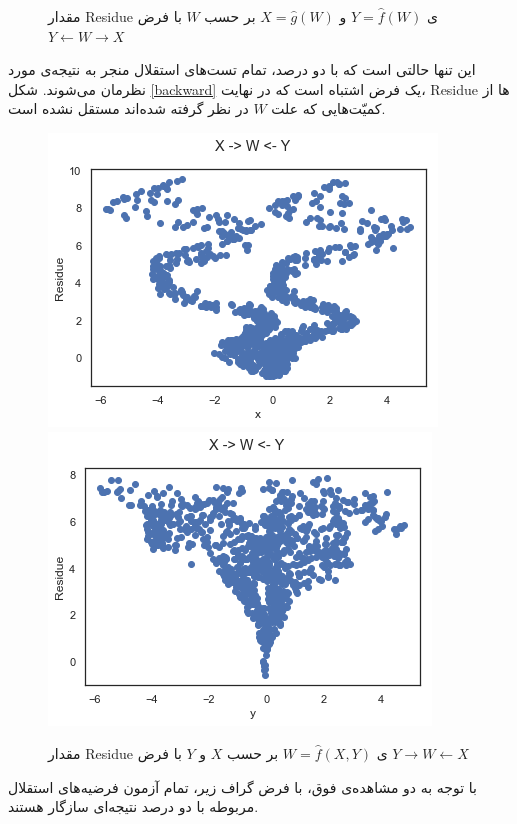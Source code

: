 \documentclass[papersize=a4]{report}
\begin{document}
\begin{itemize}
\begin{figure}
\caption{
مقدار Residue ی
$ Y=\hat{f}(W) $
و
$ X = \hat{g}(W)$
  بر حسب $W$ با فرض
$ Y \leftarrow W \rightarrow X$
}
\label{Forward}
\end{figure}


این تنها حالتی است که با 
دو درصد، تمام تست‌های استقلال منجر به نتیجه‌ی مورد نظرمان می‌شوند. 
شکل
\eqref{backward}
  یک فرض اشتباه است که در نهایت، Residue  ها از کمیّت‌هایی که علت ‌$W$ در نظر گرفته شده‌اند مستقل نشده است.

\begin{figure}[h]
\centering
\begin{floatrow}
	\includegraphics[scale=0.45]{back1.png}
	\includegraphics[scale=0.45]{back2.png}
\end{floatrow}

\caption{
مقدار Residue ی 
$W = \hat{f}(X, Y)$
بر حسب $X$ و $Y$ با فرض 
$Y \rightarrow W \leftarrow X$
}
\label{backward}
\end{figure}
\end{itemize}


با توجه به دو مشاهده‌ی فوق، با فرض گراف زیر، تمام آزمون فرضیه‌های استقلال مربوطه با
دو درصد نتیجه‌ای سازگار هستند.
\end{document}
